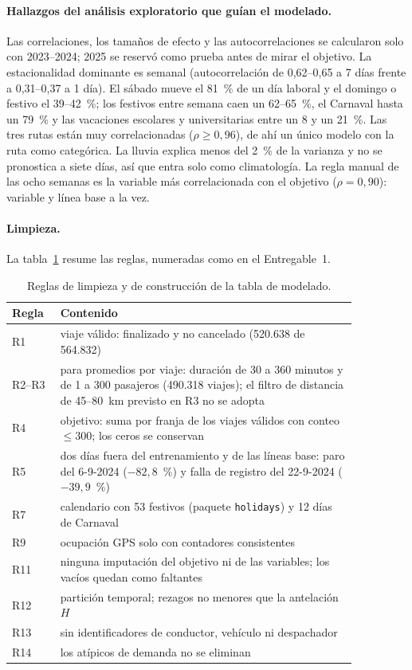 \paragraph{Hallazgos del análisis exploratorio que guían el modelado.}
Las correlaciones, los tamaños de efecto y las autocorrelaciones se calcularon solo con 2023--2024; 2025 se
reservó como prueba antes de mirar el objetivo. La estacionalidad dominante es semanal (autocorrelación de
0,62--0,65 a 7 días frente a 0,31--0,37 a 1 día). El sábado mueve el 81~\% de un día laboral y el domingo o
festivo el 39--42~\%; los festivos entre semana caen un 62--65~\%, el Carnaval hasta un 79~\% y las
vacaciones escolares y universitarias entre un 8 y un 21~\%. Las tres rutas están muy correlacionadas
($\rho \geq 0{,}96$), de ahí un único modelo con la ruta como categórica. La lluvia explica menos
del 2~\% de la varianza y no se pronostica a siete días, así que entra solo como climatología. La regla
manual de las ocho semanas es la variable más correlacionada con el objetivo ($\rho = 0{,}90$): variable y
línea base a la vez.

\paragraph{Limpieza.}
La tabla~\ref{tab:limpieza} resume las reglas, numeradas como en el Entregable~1.

\begin{table}[t]
  \centering\small
  \caption{Reglas de limpieza y de construcción de la tabla de modelado.}
  \label{tab:limpieza}
  \begin{tabular}{@{}l >{\raggedright\arraybackslash}p{0.86\linewidth}@{}}
    \toprule
    Regla & Contenido \\
    \midrule
    R1 & viaje válido: finalizado y no cancelado (520.638 de 564.832) \\
    R2--R3 & para promedios por viaje: duración de 30 a 360 minutos y de 1 a 300 pasajeros (490.318 viajes); el filtro de distancia de 45--80~km previsto en R3 no se adopta \\
    R4 & objetivo: suma por franja de los viajes válidos con conteo $\leq 300$; los ceros se conservan \\
    R5 & dos días fuera del entrenamiento y de las líneas base: paro del 6-9-2024 ($-82{,}8$~\%) y falla de registro del 22-9-2024 ($-39{,}9$~\%) \\
    R7 & calendario con 53 festivos (paquete \texttt{holidays}) y 12 días de Carnaval \\
    R9 & ocupación GPS solo con contadores consistentes \\
    R11 & ninguna imputación del objetivo ni de las variables; los vacíos quedan como faltantes \\
    R12 & partición temporal; rezagos no menores que la antelación $H$ \\
    R13 & sin identificadores de conductor, vehículo ni despachador \\
    R14 & los atípicos de demanda no se eliminan \\
    \bottomrule
  \end{tabular}
\end{table}

